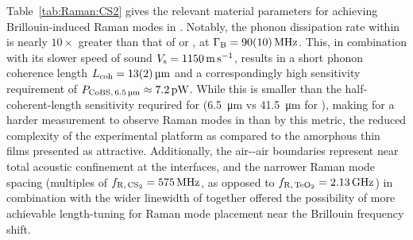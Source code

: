 Table~\ref{tab:Raman:CS2} gives the relevant material parameters for achieving Brillouin-induced Raman modes in . Notably, the phonon dissipation rate within  is nearly \(10\times\) greater than that of  or , at \(\Gamma_{\rm B} = \SI{90(10)}{\mega\hertz}\). This, in combination with its slower speed of sound \(V_{\rm s} = \SI{1150}{\meter\per\second}\), results in a short phonon coherence length \(L_{\rm coh} = \SI{13(2)}{\micro\meter}\) and a correspondingly high sensitivity requirement of \(P_{\rm CoBS,\,\SI{6.5}{\micro\meter}} \approx \SI{7.2}{\pico\watt}\). While this is smaller than the half-coherent-length sensitivity requrired for  (\SI{6.5}{\micro\meter} vs \SI{41.5}{\micro\meter} for ), making for a harder measurement to observe Raman modes in  than  by this metric, the reduced complexity of the  experimental platform as compared to the amorphous thin films presented as attractive. Additionally, the air--air boundaries represent near total acoustic confinement at the interfaces, and the narrower Raman mode spacing (multiples of \(f_{\rm R,\,\ce{CS2}} = \SI{575}{\mega\hertz}\), as opposed to \(f_{\rm R,\,\ce{TeO2}} = \SI{2.13}{\giga\hertz}\)) in combination with the wider linewidth of  together offered the possibility of more achievable length-tuning for Raman mode placement near the Brillouin frequency shift.


